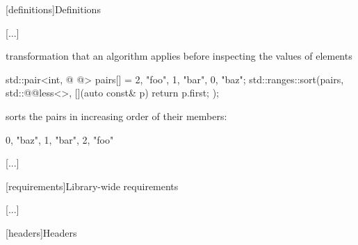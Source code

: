 \setcounter{section}{2}
[definitions]{Definitions}

[...]

\begin{addedblock}
\setcounter{subsection}{17}
%
 transformation that
an algorithm applies before inspecting the values of elements

\begin{example}
\begin{codeblock}
std::pair<int, @ @> pairs[] = {{2, "foo"}, {1, "bar"}, {0, "baz"}};
std::ranges::sort(pairs, std::@@less<>{}, [](auto const& p) { return p.first; });
\end{codeblock}
sorts the pairs in increasing order of their  members:
\begin{codeblock}
{{0, "baz"}, {1, "bar"}, {2, "foo"}}
\end{codeblock}
\end{example}
\end{addedblock}

[...]

\setcounter{section}{4}
[requirements]{Library-wide requirements}

[...]

\setcounter{subsection}{1}
\setcounter{subsubsection}{1}
[headers]{Headers}

